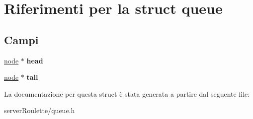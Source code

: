 \hypertarget{structqueue}{
\section{Riferimenti per la struct queue}
\label{structqueue}
}
\subsection*{Campi}
\begin{DoxyCompactItemize}
\item 
\hypertarget{structqueue_a59dd942ec5995b18f6e2df2232ec9e16}{
\hyperlink{structnode__tag}{node} $\ast$ {\bfseries head}}
\label{structqueue_a59dd942ec5995b18f6e2df2232ec9e16}

\item 
\hypertarget{structqueue_a1fa8a11929cec8f42e26c43c6772eada}{
\hyperlink{structnode__tag}{node} $\ast$ {\bfseries tail}}
\label{structqueue_a1fa8a11929cec8f42e26c43c6772eada}

\end{DoxyCompactItemize}


La documentazione per questa struct è stata generata a partire dal seguente file:\begin{DoxyCompactItemize}
\item 
serverRoulette/queue.h\end{DoxyCompactItemize}
